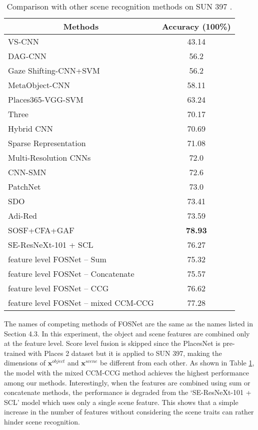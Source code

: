 \documentclass[journal,comsoc]{IEEEtran}
\begin{document}
\begin{table}[]
\centering
\caption{Comparison with other scene recognition methods on SUN 397 \cite{b33}.}
\begin{tabular}{lc}
\toprule
\multicolumn{1}{c}{Methods}           & Accuracy (100\%) \\
\midrule
VS-CNN \cite{b15}                     & 43.14            \\
DAG-CNN \cite{b10}                    & 56.2             \\
Gaze Shifting-CNN+SVM \cite{b12}      & 56.2             \\
MetaObject-CNN \cite{b14}             & 58.11            \\
Places365-VGG-SVM \cite{b20}          & 63.24            \\
Three \cite{b7}                       & 70.17            \\
Hybrid CNN \cite{b8}                  & 70.69            \\
Sparse Representation \cite{b17}      & 71.08            \\
Multi-Resolution CNNs \cite{b5}       & 72.0             \\
CNN-SMN \cite{b13}                    & 72.6             \\
PatchNet \cite{b16}                   & 73.0             \\
SDO \cite{b9}                         & 73.41            \\
Adi-Red \cite{b6}                     & 73.59            \\
SOSF+CFA+GAF \cite{b4}                & \textbf{78.93}   \\
SE-ResNeXt-101 + SCL                  & 76.27            \\
feature level FOSNet – Sum            & 75.32            \\
feature level FOSNet – Concatenate    & 75.57            \\
feature level FOSNet – CCG           & 76.62            \\
feature level FOSNet – mixed CCM-CCG & 77.28           \\
\bottomrule
\end{tabular}
\label{tab2}
\end{table}

The names of competing methods of FOSNet are the same as the names listed in Section 4.3. In this experiment, the object and scene features are combined only at the feature level. Score level fusion is skipped since the PlacesNet is pre-trained with Places 2 dataset but it is applied to SUN 397, making the dimensions of $\bm{x}^{object}$ and $\bm{x}^{scene}$ be different from each other. As shown in Table \ref{tab2}, the model with the mixed CCM-CCG method achieves the highest performance among our methods. Interestingly, when the features are combined using sum or concatenate methods, the performance is degraded from the `SE-ResNeXt-101 + SCL' model which uses only a single scene feature. This shows that a simple increase in the number of features without considering the scene traits can rather hinder scene recognition.
\end{document}
